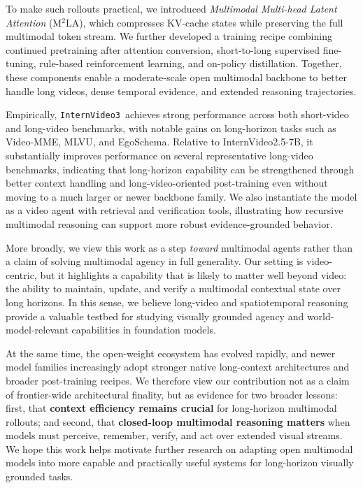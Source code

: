 \documentclass[11pt, letterpaper]{template}
\theoremstyle{plain}
\theoremstyle{definition}
\theoremstyle{remark}
\newcommand{\name}{\texttt{InternVideo3}\xspace}
\begin{document}
To make such rollouts practical, we introduced \emph{Multimodal Multi-head Latent Attention} (M$^2$LA), which compresses KV-cache states while preserving the full multimodal token stream. We further developed a training recipe combining continued pretraining after attention conversion, short-to-long supervised fine-tuning, rule-based reinforcement learning, and on-policy distillation. Together, these components enable a moderate-scale open multimodal backbone to better handle long videos, dense temporal evidence, and extended reasoning trajectories.

Empirically, \name\ achieves strong performance across both short-video and long-video benchmarks, with notable gains on long-horizon tasks such as Video-MME, MLVU, and EgoSchema. Relative to InternVideo2.5-7B, it substantially improves performance on several representative long-video benchmarks, indicating that long-horizon capability can be strengthened through better context handling and long-video-oriented post-training even without moving to a much larger or newer backbone family. We also instantiate the model as a video agent with retrieval and verification tools, illustrating how recursive multimodal reasoning can support more robust evidence-grounded behavior.

More broadly, we view this work as a step \emph{toward} multimodal agents rather than a claim of solving multimodal agency in full generality. Our setting is video-centric, but it highlights a capability that is likely to matter well beyond video: the ability to maintain, update, and verify a multimodal contextual state over long horizons. In this sense, we believe long-video and spatiotemporal reasoning provide a valuable testbed for studying visually grounded agency and world-model-relevant capabilities in foundation models.

At the same time, the open-weight ecosystem has evolved rapidly, and newer model families increasingly adopt stronger native long-context architectures and broader post-training recipes. We therefore view our contribution not as a claim of frontier-wide architectural finality, but as evidence for two broader lessons: first, that \textbf{context efficiency remains crucial} for long-horizon multimodal rollouts; and second, that \textbf{closed-loop multimodal reasoning matters} when models must perceive, remember, verify, and act over extended visual streams. We hope this work helps motivate further research on adapting open multimodal models into more capable and practically useful systems for long-horizon visually grounded tasks.
\end{document}
